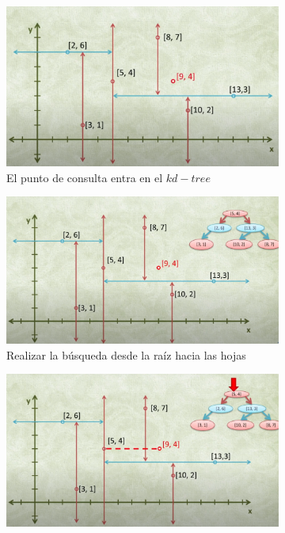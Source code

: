 \documentclass{article}
\begin{document}
    	    \begin{figure}
             \centering
             \begin{subfigure}[b]{0.4\linewidth}
                 \centering
                 \includegraphics[width=\textwidth]{img/knn1.PNG}
                 \caption{El punto de consulta entra en el $kd-tree$}
                 \label{fig:knn1}
             \end{subfigure}
             \hfill
             \begin{subfigure}[b]{0.4\linewidth}
                 \centering
                 \includegraphics[width=\textwidth]{img/knn2.PNG}
                 \caption{Realizar la búsqueda desde la raíz hacia las hojas}
                 \label{fig:knn2}
             \end{subfigure}
             \hfill
             \begin{subfigure}[b]{0.4\linewidth}
                 \centering
                 \includegraphics[width=\textwidth]{img/knn3.PNG}

\end{subfigure}
\end{figure}
\end{document}
